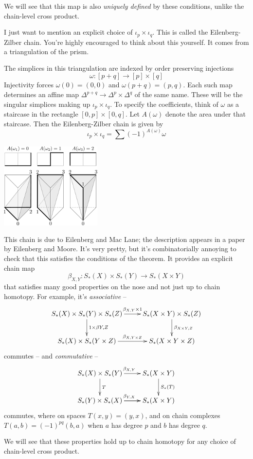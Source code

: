 We will see that this map is also \emph{uniquely defined} by these conditions, unlike the chain-level cross product.

I just want to mention an explicit choice of $\iota_p\times\iota_q$. This is called the Eilenberg-Zilber chain. You're highly encouraged to think about this yourself. It comes from a triangulation of the prism. 

The simplices in this triangulation are indexed by order preserving injections
\[
\omega:[p+q]\to[p]\times[q]
\]
Injectivity forces $\omega(0)=(0,0)$ and $\omega(p+q)=(p,q)$. Each such map
determines an affine map $\Delta^{p+q}\to\Delta^p\times\Delta^q$ of the same name. These will be
the singular simplices making up $\iota_p\times\iota_q$. To specify the coefficients, think of $\omega$ as a staircase in the rectangle $[0,p]\times[0,q]$. 
Let $A(\omega)$ denote the area under that staircase. Then the Eilenberg-Zilber chain is given by 
\[
\iota_p\times\iota_q=\sum(-1)^{A(\omega)}\omega
\]

\medskip
\begin{center}
\includegraphics[width=2in]{905/Figures/07-EZ-triangulation.pdf}
\end{center}


This chain is due to Eilenberg and Mac Lane; the description appears 
in a paper \cite{eilenberg-moore} by Eilenberg and Moore. 
It's very pretty, but it's combinatorially annoying to check that this satisfies the conditions of the theorem. It provides an explicit chain map
\[
\beta_{X,Y}:S_*(X)\times S_*(Y)\to S_*(X\times Y)
\]
that satisfies many good properties on the nose and not just up to chain homotopy. For example, it's {\em associative} --
\[
\xymatrix{
S_*(X)\times S_*(Y)\times S_*(Z) \ar[r]^-{\beta_{X,Y}\times 1} 
\ar[d]^{1\times\beta{Y,Z}} &
S_*(X\times Y)\times S_*(Z) \ar[d]^{\beta_{X\times Y,Z}} \\
S_*(X)\times S_*(Y\times Z) \ar[r]^-{\beta_{X,Y\times Z}} &
S_*(X\times Y\times Z)
}\]
commutes -- and {\em commutative} --
\[
\xymatrix{
S_*(X)\times S_*(Y) \ar[r]^{\beta_{X,Y}} \ar[d]^{T} & 
S_*(X\times Y) \ar[d]^{S_*(T)} \\
S_*(Y)\times S_*(X) \ar[r]^{\beta_{Y,X}} \ar[r] & S_*(X\times Y)
}\]
commutes, where on spaces $T(x,y)=(y,x)$, and on chain complexes
$T(a,b)=(-1)^{pq}(b,a)$ when $a$ has degree $p$ and $b$ has degree $q$. 

We will see that these properties hold up to chain homotopy for any 
choice of chain-level cross product.

